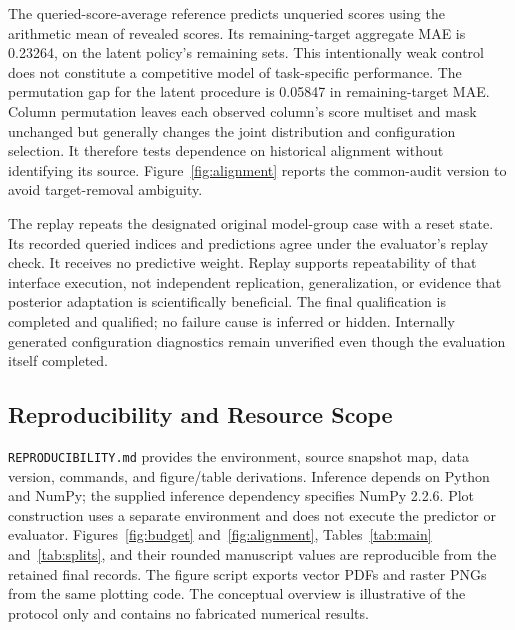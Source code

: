 \documentclass{article}
\begin{document}
The queried-score-average reference predicts unqueried scores using the arithmetic mean of revealed scores. Its remaining-target aggregate MAE is 0.23264, on the latent policy's remaining sets. This intentionally weak control does not constitute a competitive model of task-specific performance. The permutation gap for the latent procedure is 0.05847 in remaining-target MAE. Column permutation leaves each observed column's score multiset and mask unchanged but generally changes the joint distribution and configuration selection. It therefore tests dependence on historical alignment without identifying its source. Figure~\ref{fig:alignment} reports the common-audit version to avoid target-removal ambiguity.

The replay repeats the designated original model-group case with a reset state. Its recorded queried indices and predictions agree under the evaluator's replay check. It receives no predictive weight. Replay supports repeatability of that interface execution, not independent replication, generalization, or evidence that posterior adaptation is scientifically beneficial. The final qualification is completed and qualified; no failure cause is inferred or hidden. Internally generated configuration diagnostics remain unverified even though the evaluation itself completed.

\subsection{Reproducibility and Resource Scope}
\texttt{REPRODUCIBILITY.md} provides the environment, source snapshot map, data version, commands, and figure/table derivations. Inference depends on Python and NumPy; the supplied inference dependency specifies NumPy 2.2.6. Plot construction uses a separate environment and does not execute the predictor or evaluator. Figures~\ref{fig:budget} and~\ref{fig:alignment}, Tables~\ref{tab:main} and~\ref{tab:splits}, and their rounded manuscript values are reproducible from the retained final records. The figure script exports vector PDFs and raster PNGs from the same plotting code. The conceptual overview is illustrative of the protocol only and contains no fabricated numerical results.
\end{document}
